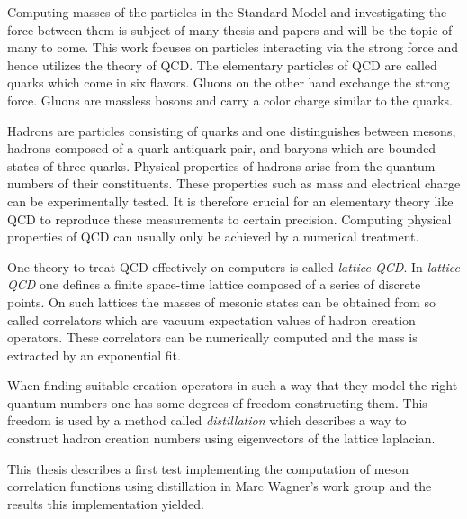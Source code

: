 Computing masses of the particles in the Standard Model and investigating the force between them is subject of many thesis and papers and will be the topic of many to come. This work focuses on particles interacting via the strong force and hence utilizes the theory of QCD. The elementary particles of QCD are called quarks which come in six flavors. Gluons on the other hand exchange the strong force. Gluons are massless bosons and carry a color charge similar to the quarks.

Hadrons are particles consisting of quarks and one distinguishes between mesons, hadrons composed of a quark-antiquark pair, and baryons which are bounded states of three quarks. Physical properties of hadrons arise from the quantum numbers of their constituents. These properties such as mass and electrical charge can be experimentally tested. It is therefore crucial for an elementary theory like QCD to reproduce these measurements to certain precision. Computing physical properties of QCD can usually only be achieved by a numerical treatment.

One theory to treat QCD effectively on computers is called \textit{lattice QCD}. In \textit{lattice QCD} one defines a finite space-time lattice composed of a series of discrete points. On such lattices the masses of mesonic states can be obtained from so called correlators which are vacuum expectation values of hadron creation operators. These correlators can be numerically computed and the mass is extracted by an exponential fit.

When finding suitable creation operators in such a way that they model the right quantum numbers one has some degrees of freedom constructing them. This freedom is used by a method called \textit{distillation} which describes a way to construct hadron creation numbers using eigenvectors of the lattice laplacian.

This thesis describes a first test implementing the computation of meson correlation functions using distillation in Marc Wagner's work group and the results this implementation yielded.